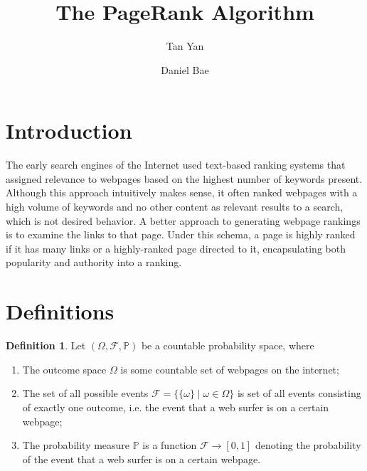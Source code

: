 \documentclass[11pt]{article}
\title{The PageRank Algorithm}
\author{Tan Yan \and Daniel Bae}
\theoremstyle{definition}
\newtheorem{definition}[theorem]{Definition}
\begin{document}
\maketitle

\section{Introduction}
The early search engines of the Internet used text-based ranking systems that assigned relevance to webpages based on the highest number of keywords present. 
Although this approach intuitively makes sense, it often ranked webpages with a high volume of keywords and no other content as relevant results to a search, which is not desired behavior.
A better approach to generating webpage rankings is to examine the links to that page.
Under this schema, a page is highly ranked if it has many links or a highly-ranked page directed to it, encapsulating both popularity and authority into a ranking.

\section{Definitions}
\begin{definition}
    Let $(\Omega, \mathcal{F}, \mathbb{P})$ be a countable probability space, where
    \begin{enumerate}
        \item The outcome space $\Omega$ is some countable set of webpages on the internet;
        \item The set of all possible events $\mathcal{F} = \{ \{\omega\} \mid \omega \in \Omega \}$ is set of all events consisting of exactly one outcome, i.e. the event that a web surfer is on a certain webpage;
        \item The probability measure $\mathbb{P}$ is a function $\mathcal{F} \to [0,1]$ denoting the probability of the event that a web surfer is on a certain webpage.
    \end{enumerate}
\end{definition}
\end{document}
